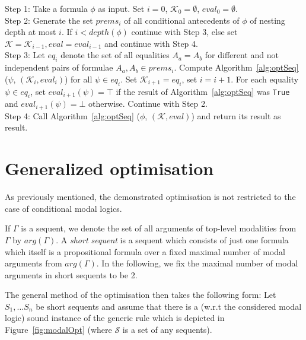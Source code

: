 \documentclass{entcs} \usepackage{entcsmacro}
\begin{document}
\begin{algorithm}[h]
\begin{alg}
\begin{upshape}
  Step 1: Take a formula $\phi$ as input. Set $i=0$, $\mathcal{K}_0=\emptyset$, $eval_0=\emptyset$.\\
  Step 2: Generate the set $prems_i$ of all conditional antecedents of $\phi$
  of nesting depth at most $i$. If $i<depth(\phi)$ continue
  with Step 3, else set $\mathcal{K}=\mathcal{K}_{i-1}, eval=eval_{i-1}$ and continue with Step 4.\\
  Step 3: Let $eq_i$ denote the set of all equalities $A_a = A_b$ for different and not independent
  pairs of formulae $A_a,A_b\in prems_i$. Compute
  Algorithm~\ref{alg:optSeq} ($\psi$, $(\mathcal{K}_i,eval_i)$) for all $\psi\in eq_i$.
  Set $\mathcal{K}_{i+1} = eq_i$, set $i = i + 1$. For each equality $\psi\in eq_i$,
  set $eval_{i+1}(\psi)=\top$ if the result of Algorithm~\ref{alg:optSeq} was \verb+True+
  and $eval_{i+1}(\psi)=\bot$ otherwise. Continue with Step 2.\\
  Step 4: Call Algorithm~\ref{alg:optSeq} ($\phi$, $(\mathcal{K},eval)$) and return its result
  as result.
\label{alg:optPreprove}
\end{upshape}
\end{alg}
\end{algorithm}

\section{Generalized optimisation}

As previously mentioned, the demonstrated optimisation is not restricted to the
case of conditional
modal logics. 

\begin{definition}
If $\Gamma$ is a sequent, we denote the set of all arguments of
top-level modalities from $\Gamma$ by $arg(\Gamma)$.
A \emph{short sequent} is a sequent which consists of just one formula which
itself is a propositional formula over a fixed maximal number of modal arguments
from $arg(\Gamma)$. In the following, we fix the maximal number of modal arguments
in short sequents to be 2.
\end{definition}

The general method of the optimisation then takes the following form: 
Let $S_1,\ldots S_n$ be short sequents and assume that there is
a (w.r.t the considered modal logic) sound instance of the generic rule which
is depicted in Figure~\ref{fig:modalOpt} (where $\mathcal{S}$ is a set of any
sequents).
\end{document}
